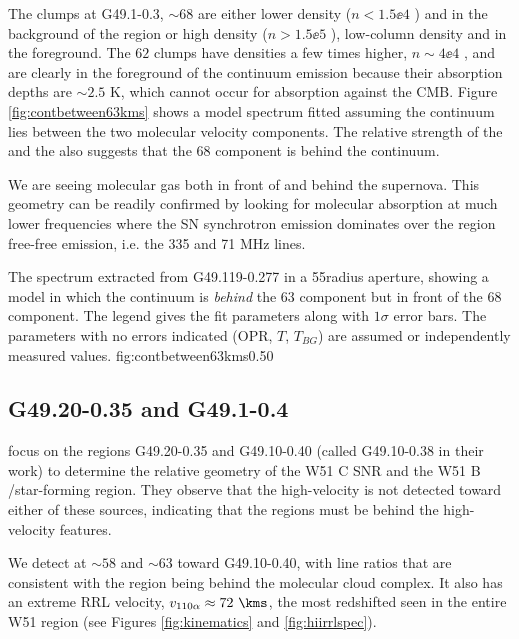 The clumps at G49.1-0.3, $\sim68$ \kms are either lower density ($n<1.5\ee{4}$
\percc) and in the background of the \hii region or high density ($n>1.5\ee{5}$
\percc), low-column density and in the foreground.  The $62$ \kms clumps have
densities a few times higher, $n\sim4\ee{4}$ \percc, and are clearly in the
foreground of the continuum emission because their absorption depths are
$\sim2.5$ K, which cannot occur for absorption against the CMB.  Figure
\ref{fig:contbetween63kms} shows a model spectrum fitted assuming the continuum
lies between the two molecular velocity components.  The relative strength of
the \thirteenco and the \formaldehyde also suggests that the 68 \kms component
is behind the continuum.

We are seeing molecular gas both in front of and behind the supernova.  This
geometry can be readily confirmed by looking for molecular absorption at much
lower frequencies where the SN synchrotron emission dominates over the \hii
region free-free emission, i.e. the 335 and 71 MHz \para lines.

{The spectrum extracted from G49.119-0.277 in a 55\arcsec radius aperture,
showing a model in which the continuum is \emph{behind} the 63 \kms component
but in front of the 68 \kms component.  The legend gives the fit parameters
along with $1\sigma$ error bars.  The parameters with no errors indicated
(OPR, $T$, $T_{BG}$) are assumed or independently measured values.}
{fig:contbetween63kms}{0.5}{0}

\subsection{G49.20-0.35 and G49.1-0.4}
\citet{Tian2013a} focus on the \hii regions G49.20-0.35 and G49.10-0.40 (called
G49.10-0.38 in their work) to determine the relative geometry
of the W51 C SNR and the W51 B \hii/star-forming region.  They observe that the
high-velocity \hi is not detected toward either of these sources, indicating
that the \hii regions must be behind the high-velocity \hi features.

We detect \formaldehyde \oneone at $\sim58$ and $\sim63$ \kms toward
G49.10-0.40, with line ratios that are consistent with the \hii region being
behind the molecular cloud complex.  It also has an extreme RRL velocity,
$v_{110\alpha} \approx 72~\kms$, the most redshifted seen in the entire W51 region
(see Figures \ref{fig:kinematics} and \ref{fig:hiirrlspec}).

